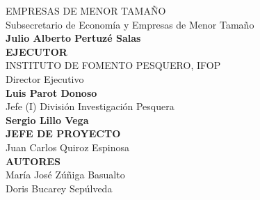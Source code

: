 \documentclass[12pt, oneside]{article} %
\begin{document}
\begin{titlepage}
\begin{minipage}{\textwidth}
\begin{flushright}
 EMPRESAS DE MENOR TAMAÑO \\ 
 \vspace*{5mm} 
  Subsecretario de Economía y Empresas de Menor Tamaño\\
 \textbf{Julio Alberto Pertuzé Salas} \\
 \vspace*{5mm} 
 \textbf{EJECUTOR} \\ 
 INSTITUTO DE FOMENTO PESQUERO, IFOP\\
 \vspace*{4mm} 
 Director Ejecutivo   
 \\ \textbf{Luis Parot Donoso} \\
 \vspace*{4mm} 
 Jefe (I) División Investigación Pesquera   
 \\ \textbf{Sergio Lillo Vega} \\
 \vspace*{8mm} 
 \fontsize{9pt}{8pt}\selectfont
 \textbf{JEFE DE PROYECTO}   \\
 Juan Carlos Quiroz Espinosa \\
 \vspace*{8mm} 
 \textbf{AUTORES}   \\
 María José Zúñiga Basualto \\ 
 Doris Bucarey Sepúlveda 
 \end{flushright} 
\end{minipage}
\vfill
\end{titlepage}

\end{document}
